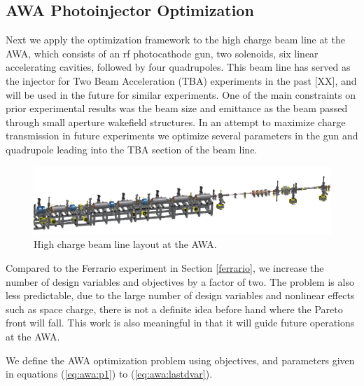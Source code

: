   
\subsection{AWA Photoinjector Optimization}
Next we apply the optimization framework to the high charge beam line at the AWA, 
which consists of an rf photocathode gun, two solenoids, six linear accelerating cavities, 
followed by four quadrupoles. This beam line has served as the injector for Two Beam 
Acceleration (TBA) experiments in the past [XX], and will be used in the future for 
similar experiments. One of the main constraints on prior experimental 
results was the beam size and emittance as the beam passed through small aperture 
wakefield structures. In an attempt to maximize charge transmission in future experiments
we optimize several parameters in the gun and quadrupole leading into the 
TBA section of the beam line.
\begin{figure}
	\centering
	\includegraphics[width=0.9\linewidth]{Report/awa-drawing}
	\caption{High charge beam line layout at the AWA.}
	\label{awa-pic}
\end{figure}


Compared to the Ferrario experiment in Section \ref{ferrario}, 
we increase the number of design variables and objectives by a factor of two.
The problem is also less predictable, due to the large number of design variables
and nonlinear effects such as space charge, there is not a definite idea
before hand where the Pareto front will fall. This work is also meaningful in that
it will guide future operations at the AWA.

We define the AWA optimization problem using objectives, and parameters given in 
equations (\ref{eq:awa:p1}) to (\ref{eq:awa:lastdvar}). 

